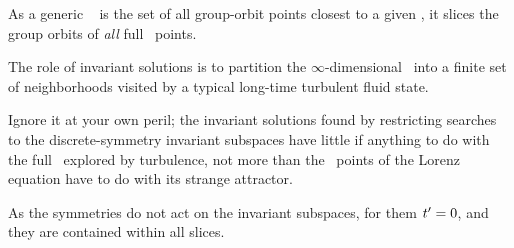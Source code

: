 As a generic \slice\  is the set of all group-orbit
points closest to a given {\template}, it slices the group orbits of
\emph{all} full \statesp\ points.

The role of invariant solutions is
to partition the $\infty$-dimensional \statesp\ into a finite set of
neighborhoods visited by a typical long-time turbulent fluid state.

Ignore it at
your own peril; the invariant solutions found by restricting
searches to the discrete-symmetry invariant subspaces have little if
anything to do with the full \statesp\ explored by turbulence, not more
than the \eqv\ points of the Lorenz equation have to do with its strange
attractor.

 As the symmetries do not act on
the invariant subspaces, for them $t'_{} = 0$, and they are
contained within all slices.
